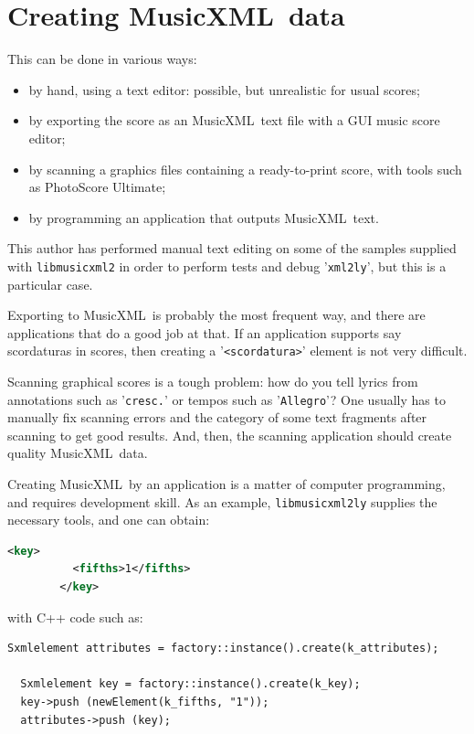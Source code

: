 \documentclass[12pt,a4paper]{article}
\newcommand{\mxml}{MusicXML}
\begin{document}
\section{Creating \mxml\ data}

This can be done in various ways:
\begin{itemize}
\item by hand, using a text editor: possible, but unrealistic for usual scores;
\item by exporting the score as an \mxml\ text file with a GUI music score editor;
\item by scanning a graphics files containing a ready-to-print score, with tools such as PhotoScore Ultimate\texttrademark;
\item by programming an application that outputs \mxml\ text.
\end{itemize}

This author has performed manual text editing on some of the samples supplied with {\tt libmusicxml2} in order to perform tests and debug {'\tt xml2ly}', but this is a particular case.

Exporting to \mxml\ is probably the most frequent way, and there are applications that do a good job at that. If an application supports say scordaturas in scores, then creating a {'\tt <scordatura>}' element is not very difficult.

Scanning graphical scores is a tough problem:  how do you tell lyrics from annotations such as {'\tt cresc.}' or tempos such as {'\tt Allegro}'? One usually has to manually fix scanning errors and the category of some text fragments after scanning to get good results. And, then, the scanning application should create quality \mxml\ data.

Creating \mxml\ by an application is a matter of computer programming, and requires development skill. As an example, {\tt libmusicxml2ly} supplies the necessary tools, and one can obtain:

\begin{lstlisting}[language=XML]
        <key>
          <fifths>1</fifths>
        </key>
\end{lstlisting}

with C++ code such as:

\begin{lstlisting}[language=XML]
  Sxmlelement attributes = factory::instance().create(k_attributes);

  Sxmlelement key = factory::instance().create(k_key);
  key->push (newElement(k_fifths, "1"));
  attributes->push (key);
\end{lstlisting}
 
\end{document}
